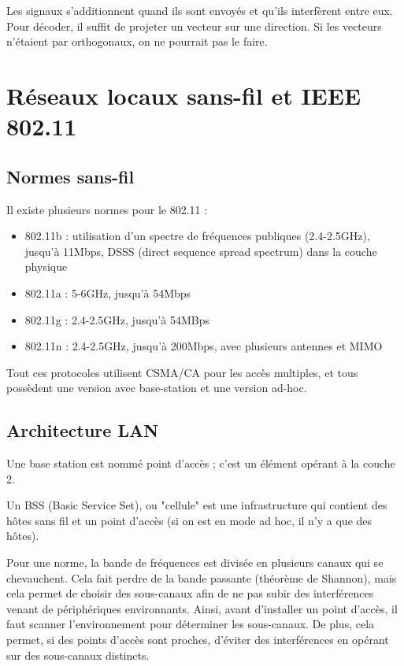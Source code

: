 		Les signaux s'additionnent quand ils sont envoyés et qu'ils interfèrent entre eux. Pour décoder, il suffit de projeter un vecteur sur une direction. Si les vecteurs n'étaient par orthogonaux, on ne pourrait pas le faire.
		
		
		
	\section{Réseaux locaux sans-fil et IEEE 802.11}
	
		\subsection{Normes sans-fil}
		Il existe plusieurs normes pour le 802.11 :
	
		\begin{itemize}
			\item 802.11b : utilisation d'un spectre de fréquences publiques (2.4-2.5GHz), jusqu'à 11Mbps, DSSS (direct sequence spread spectrum) dans la couche physique
			\item 802.11a :  5-6GHz, jusqu'à 54Mbps
			\item 802.11g : 2.4-2.5GHz, jusqu'à 54MBps
			\item 802.11n : 2.4-2.5GHz, jusqu'à 200Mbps, avec plusieurs antennes et MIMO
		\end{itemize}
	
		Tout ces protocoles utilisent CSMA/CA pour les accès multiples, et tous possèdent une version avec base-station et une version ad-hoc.
		
		\subsection{Architecture LAN}
		
		Une base station est nommé point d'accès ; c'est un élément opérant à la couche 2.
		
		Un BSS (Basic Service Set), ou "cellule" est une infrastructure qui contient des hôtes sans fil et un point d'accès (si on est en mode ad hoc, il n'y a que des hôtes).
	
	
		Pour une norme, la bande de fréquences est divisée en plusieurs canaux qui se chevauchent. Cela fait perdre de la bande passante (théorème de Shannon), mais cela permet de choisir des sous-canaux afin de ne pas subir des interférences venant de périphériques environnants. Ainsi, avant d'installer un point d'accès, il faut scanner l'environnement pour déterminer les sous-canaux. De plus, cela permet, si des points d'accès sont proches, d'éviter des interférences en opérant sur des sous-canaux distincts.
		
